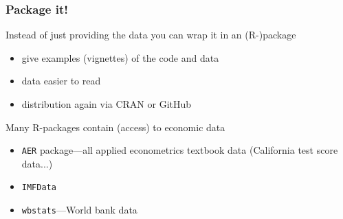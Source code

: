 \documentclass[ignorenonframetext]{beamer}
\begin{document}
\begin{frame}
  \frametitle{Package it!}
  Instead of just providing the data you can wrap it in an \alert{(R-)package}
  \begin{itemize}
    \item give examples (vignettes) of the code and data
    \item data easier to read
    \item distribution again via CRAN or \alert{GitHub}\newline
  \end{itemize}
  Many R-packages contain (access) to economic data
  \begin{itemize}
    \item \texttt{AER} package---all applied econometrics textbook data (California test score data...)
    \item \texttt{IMFData}
    \item \texttt{wbstats}---World bank data
  \end{itemize}

\end{frame}
\end{document}
